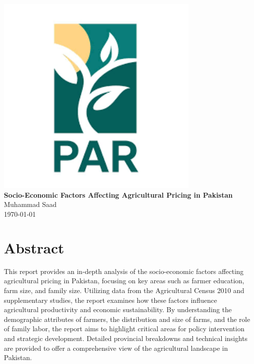 \documentclass[12pt]{article}
\begin{document}
\begin{titlepage}
    \centering
    \vspace*{\fill} %
    \includegraphics[width=10cm]{img/logo2.png}\\[1cm] %
    {\Large \textbf{Socio-Economic Factors Affecting Agricultural Pricing in Pakistan}}\\[0.5cm]
    {\large Muhammad Saad}\\[0.2cm]
    {\large \today}\\[0.5cm]
    \vspace*{\fill}
\end{titlepage}

\newpage
\tableofcontents
\newpage

\section*{Abstract}
This report provides an in-depth analysis of the socio-economic factors affecting agricultural pricing in Pakistan, focusing on key areas such as farmer education, farm size, and family size. Utilizing data from the Agricultural Census 2010 and supplementary studies, the report examines how these factors influence agricultural productivity and economic sustainability. By understanding the demographic attributes of farmers, the distribution and size of farms, and the role of family labor, the report aims to highlight critical areas for policy intervention and strategic development. Detailed provincial breakdowns and technical insights are provided to offer a comprehensive view of the agricultural landscape in Pakistan.
\end{document}
